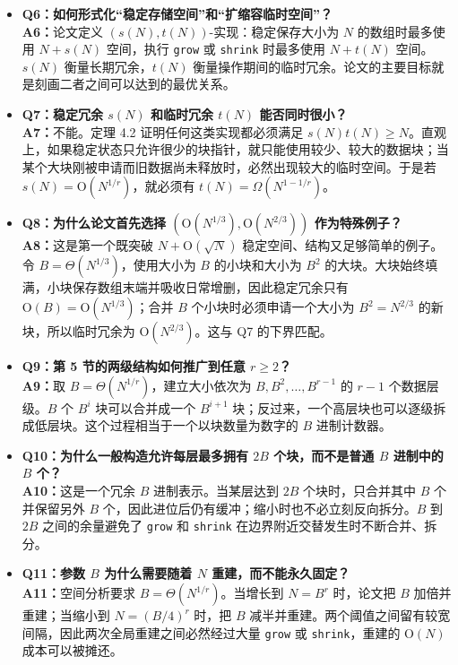 \documentclass[UTF8,11pt,a4paper]{ctexart}
\newcommand{\op}[1]{\textnormal{\texttt{#1}}}
\newcommand{\Oh}{\mathrm{O}}
\newcommand{\Th}{\Theta}
\begin{document}
\begin{itemize}[label={},leftmargin=0pt,itemsep=1.0em,topsep=0.5em]
  \item \textbf{Q6：如何形式化“稳定存储空间”和“扩缩容临时空间”？}
  \\
  \textbf{A6：}论文定义 $(s(N),t(N))$-实现：稳定保存大小为 $N$ 的数组时最多使用 $N+s(N)$ 空间，执行 \op{grow} 或 \op{shrink} 时最多使用 $N+t(N)$ 空间。$s(N)$ 衡量长期冗余，$t(N)$ 衡量操作期间的临时冗余。论文的主要目标就是刻画二者之间可以达到的最优关系。

  \item \textbf{Q7：稳定冗余 $s(N)$ 和临时冗余 $t(N)$ 能否同时很小？}
  \\
  \textbf{A7：}不能。定理 4.2 证明任何这类实现都必须满足 $s(N)t(N)\geq N$。直观上，如果稳定状态只允许很少的块指针，就只能使用较少、较大的数据块；当某个大块刚被申请而旧数据尚未释放时，必然出现较大的临时空间。于是若 $s(N)=\Oh(N^{1/r})$，就必须有 $t(N)=\Omega(N^{1-1/r})$。

  \item \textbf{Q8：为什么论文首先选择 $(\Oh(N^{1/3}),\Oh(N^{2/3}))$ 作为特殊例子？}
  \\
  \textbf{A8：}这是第一个既突破 $N+\Oh(\sqrt{N})$ 稳定空间、结构又足够简单的例子。令 $B=\Th(N^{1/3})$，使用大小为 $B$ 的小块和大小为 $B^2$ 的大块。大块始终填满，小块保存数组末端并吸收日常增删，因此稳定冗余只有 $\Oh(B)=\Oh(N^{1/3})$；合并 $B$ 个小块时必须申请一个大小为 $B^2=N^{2/3}$ 的新块，所以临时冗余为 $\Oh(N^{2/3})$。这与 Q7 的下界匹配。

  \item \textbf{Q9：第 5 节的两级结构如何推广到任意 $r\geq2$？}
  \\
  \textbf{A9：}取 $B=\Th(N^{1/r})$，建立大小依次为 $B,B^2,\ldots,B^{r-1}$ 的 $r-1$ 个数据层级。$B$ 个 $B^i$ 块可以合并成一个 $B^{i+1}$ 块；反过来，一个高层块也可以逐级拆成低层块。这个过程相当于一个以块数量为数字的 $B$ 进制计数器。

  \item \textbf{Q10：为什么一般构造允许每层最多拥有 $2B$ 个块，而不是普通 $B$ 进制中的 $B$ 个？}
  \\
  \textbf{A10：}这是一个冗余 $B$ 进制表示。当某层达到 $2B$ 个块时，只合并其中 $B$ 个并保留另外 $B$ 个，因此进位后仍有缓冲；缩小时也不必立刻反向拆分。$B$ 到 $2B$ 之间的余量避免了 \op{grow} 和 \op{shrink} 在边界附近交替发生时不断合并、拆分。

  \item \textbf{Q11：参数 $B$ 为什么需要随着 $N$ 重建，而不能永久固定？}
  \\
  \textbf{A11：}空间分析要求 $B=\Th(N^{1/r})$。当增长到 $N=B^r$ 时，论文把 $B$ 加倍并重建；当缩小到 $N=(B/4)^r$ 时，把 $B$ 减半并重建。两个阈值之间留有较宽间隔，因此两次全局重建之间必然经过大量 \op{grow} 或 \op{shrink}，重建的 $\Oh(N)$ 成本可以被摊还。


\end{itemize}
\end{document}
